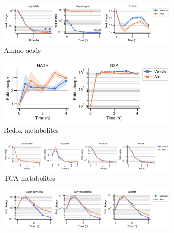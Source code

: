 \begin{figure}[!ht]
    \captionsetup{labelformat=empty}
    \centering
    \begin{subfigure}[b]{0.68\textwidth}
        \includegraphics[width=\textwidth]{figures/chap2/app/HT1080_Anti_AA.pdf}
        \caption{Amino acids}
        \label{fig:app_ch2:HT1080_Anti_AA}
    \end{subfigure}
    \hfill
    \begin{subfigure}[b]{0.45\textwidth}
        \includegraphics[width=\textwidth]{figures/chap2/app/HT1080_Anti_rd.pdf}
        \caption{Redox metabolites}
        \label{fig:app_ch2:HT1080_Anti_rd}
    \end{subfigure}
    \hfill
    \begin{subfigure}[b]{0.9\textwidth}
        \includegraphics[width=\textwidth]{figures/chap2/app/HT1080_Anti_tca.pdf}
        \caption{TCA metabolites}
        \label{fig:app_ch2:HT1080_Anti_tca}
    \end{subfigure}
    \hfill
    \begin{subfigure}[b]{0.68\textwidth}
        \includegraphics[width=\textwidth]{figures/chap2/app/HT1080_Anti_pyr.pdf}

\end{subfigure}
\end{figure}
